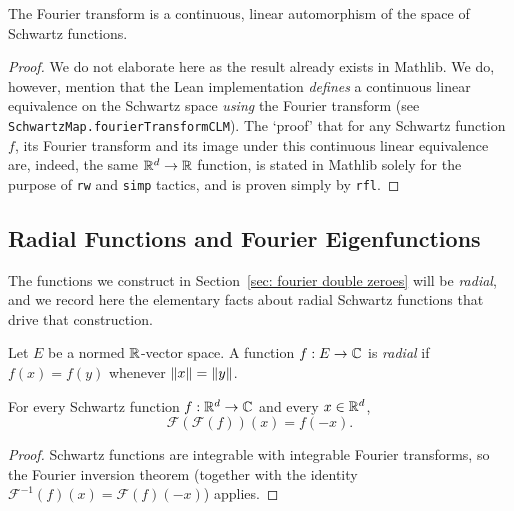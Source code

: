 \begin{lemma}\label{lemma:Fourier-transform-is-automorphism}\leanok
  The Fourier transform is a continuous, linear automorphism of the space of Schwartz functions.
\end{lemma}
\begin{proof}\leanok
  We do not elaborate here as the result already exists in Mathlib. We do, however, mention that the Lean implementation \emph{defines} a continuous linear equivalence on the Schwartz space \emph{using} the Fourier transform (see \verb|SchwartzMap.fourierTransformCLM|). The `proof' that for any Schwartz function $f$, its Fourier transform and its image under this continuous linear equivalence are, indeed, the same $\mathbb{R}^d \to \mathbb{R}$ function, is stated in Mathlib solely for the purpose of \verb|rw| and \verb|simp| tactics, and is proven simply by \verb|rfl|.
\end{proof}

\subsection{Radial Functions and Fourier Eigenfunctions}

The functions we construct in Section~\ref{sec: fourier double zeroes} will be \emph{radial}, and we record here the elementary facts about radial Schwartz functions that drive that construction.

\begin{definition}\label{def:radial-function}\leanok\mathlibok
  Let $E$ be a normed $\mathbb{R}$-vector space. A function $f : E \to \mathbb{C}$ is \emph{radial} if $f(x) = f(y)$ whenever $\left\lVert x \right\rVert = \left\lVert y \right\rVert$.
\end{definition}

\begin{lemma}\label{lemma:fourier-involution}\leanok
  For every Schwartz function $f : \mathbb{R}^d \to \mathbb{C}$ and every $x \in \mathbb{R}^d$,
  \[
    \mathcal{F}(\mathcal{F}(f))(x) = f(-x).
  \]
\end{lemma}
\begin{proof}\leanok
  Schwartz functions are integrable with integrable Fourier transforms, so the Fourier inversion theorem (together with the identity $\mathcal{F}^{-1}(f)(x) = \mathcal{F}(f)(-x)$) applies.
\end{proof}

